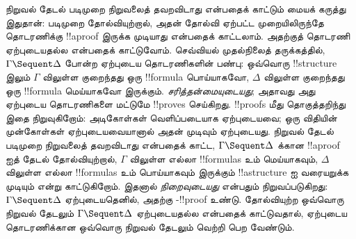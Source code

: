 \documentclass[../../../include/open-logic-section]{subfiles}
\begin{document}
நிறுவல் தேடல் படிமுறை நிறுவலைத் தவறவிடாது
என்பதைக் காட்டும் மையக் கருத்து இதுதான்:
படிமுறை தோல்வியுற்றால், அதன் தோல்வி ஏற்பட்ட
முறையிலிருந்தே தொடரணிக்கு !!a{proof} இருக்க
முடியாது என்பதைக் காட்டலாம். அதற்குத்
தொடரணி ஏற்புடையதல்ல என்பதைக் காட்டுவோம்.
செவ்வியல் முதல்நிலைத் தருக்கத்தில்,
$\Gamma \Sequent \Delta$ போன்ற ஏற்புடைய
தொடரணிகளின் பண்பு: ஒவ்வொரு !!{structure} இலும்
$\Gamma$ விலுள்ள குறைந்தது ஒரு !!{formula}
பொய்யாகவோ, $\Delta$ விலுள்ள குறைந்தது ஒரு
!!{formula} மெய்யாகவோ இருக்கும். 
\emph{சரித்தன்மையுடையது}; அதாவது அது ஏற்புடைய
தொடரணிகளை மட்டுமே !!{prove}s செய்கிறது.
!!{proof}s மீது தொகுத்தறிந்து இதை நிறுவுகிறோம்:
அடிகோள்கள் வெளிப்படையாக ஏற்புடையவை; ஒரு விதியின்
முன்கோள்கள் ஏற்புடையவையானால் அதன் முடிவும் ஏற்புடையது.
நிறுவல் தேடல் படிமுறை நிறுவலைத் தவறவிடாது என்பதைக்
காட்ட, $\Gamma \Sequent \Delta$ க்கான
!!a{proof} ஐத் தேடல் தோல்வியுற்றால்,
$\Gamma$ விலுள்ள எல்லா !!{formula}s உம் மெய்யாகவும்,
$\Delta$ விலுள்ள எல்லா !!{formula}s உம் பொய்யாகவும்
இருக்கும் !!a{structure} ஐ வரையறுக்க முடியும்
என்று காட்டுகிறோம். இதனால் 
\emph{நிறைவுடையது} என்பதும் நிறுவப்படுகிறது:
$\Gamma \Sequent \Delta$ ஏற்புடையதெனில்,
அதற்கு -!!{proof} உண்டு. தோல்வியுற்ற
ஒவ்வொரு நிறுவல் தேடலும்
$\Gamma \Sequent \Delta$ ஏற்புடையதல்ல என்பதைக்
காட்டுவதால், ஏற்புடைய தொடரணிக்கான ஒவ்வொரு
நிறுவல் தேடலும் வெற்றி பெற வேண்டும்.
\end{document}
